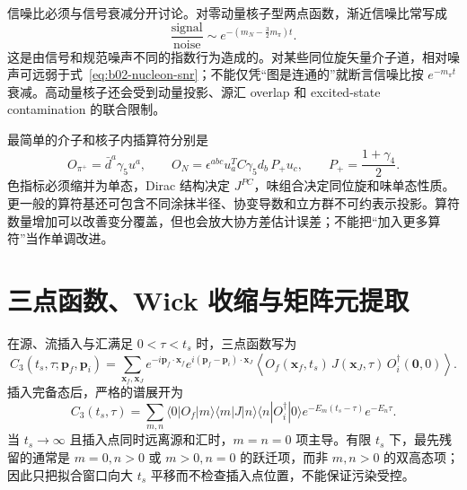 信噪比必须与信号衰减分开讨论。对零动量核子型两点函数，渐近信噪比常写成
\begin{equation}
  \frac{\text{signal}}{\text{noise}}
  \sim e^{-(m_N-\tfrac32m_\pi)t}.
  \label{eq:b02-nucleon-snr}
\end{equation}
这是由信号和规范噪声不同的指数行为造成的。对某些同位旋矢量介子道，相对噪声可远弱于式~\eqref{eq:b02-nucleon-snr}；不能仅凭“图是连通的”就断言信噪比按 \(e^{-m_\pi t}\) 衰减。高动量核子还会受到动量投影、源汇 overlap 和 excited-state contamination 的联合限制。

最简单的介子和核子内插算符分别是
\begin{equation}
  O_{\pi^+}=\bar d^a\gamma_5u^a,
  \qquad
  O_N=\epsilon^{abc}u_a^T C\gamma_5d_b\,P_+u_c,
  \qquad
  P_+=\frac{1+\gamma_4}{2}.
  \label{eq:b02-interpolators}
\end{equation}
色指标必须缩并为单态，Dirac 结构决定 \(J^{PC}\)，味组合决定同位旋和味单态性质。更一般的算符基还可包含不同涂抹半径、协变导数和立方群不可约表示投影。算符数量增加可以改善变分覆盖，但也会放大协方差估计误差；不能把“加入更多算符”当作单调改进。

\section{三点函数、Wick 收缩与矩阵元提取}\label{subsec:b02-three-point}

在源、流插入与汇满足 \(0<\tau<t_s\) 时，三点函数写为
\begin{equation}
  C_3(t_s,\tau;\mathbf p_f,\mathbf p_i)
  =
  \sum_{\mathbf x_f,\mathbf x_J}
  e^{-i\mathbf p_f\cdot\mathbf x_f}
  e^{i(\mathbf p_f-\mathbf p_i)\cdot\mathbf x_J}
  \left\langle
  O_f(\mathbf x_f,t_s)\,
  J(\mathbf x_J,\tau)\,
  O_i^\dagger(\mathbf 0,0)
  \right\rangle .
  \label{eq:b02-three-point}
\end{equation}
插入完备态后，严格的谱展开为
\begin{equation}
  C_3(t_s,\tau)
  =\sum_{m,n}
  \langle 0|O_f|m\rangle
  \langle m|J|n\rangle
  \langle n|O_i^\dagger|0\rangle
  e^{-E_m(t_s-\tau)}e^{-E_n\tau}.
  \label{eq:b02-three-spectral}
\end{equation}
当 \(t_s\to\infty\) 且插入点同时远离源和汇时，\(m=n=0\) 项主导。有限 \(t_s\) 下，最先残留的通常是 \(m=0,n>0\) 或 \(m>0,n=0\) 的跃迁项，而非 \(m,n>0\) 的双高态项；因此只把拟合窗口向大 \(t_s\) 平移而不检查插入点位置，不能保证污染受控。


